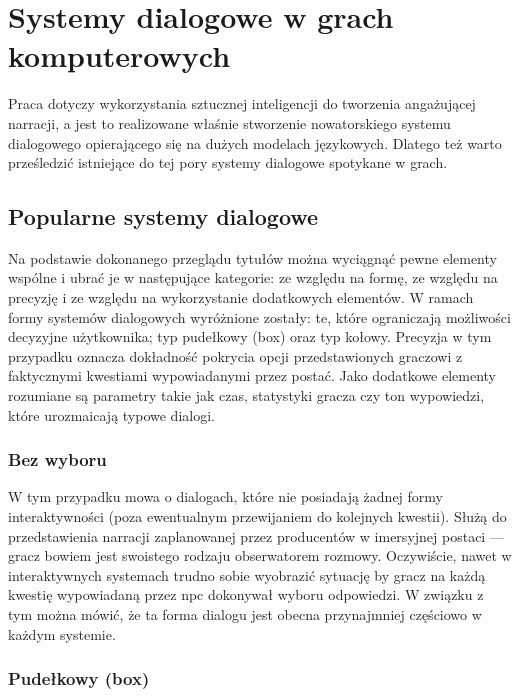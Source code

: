 \graphicspath{{chapters/chapter3/imgs/}}

\chapter{Systemy dialogowe w grach komputerowych}\label{section:ch3}

Praca dotyczy wykorzystania sztucznej inteligencji do tworzenia angażującej narracji, a jest
to realizowane właśnie stworzenie nowatorskiego systemu dialogowego opierającego się
na dużych modelach językowych. Dlatego też warto prześledzić istniejące do tej pory systemy
dialogowe spotykane w grach.

\section{Popularne systemy dialogowe}\label{subsection:ch3_1}

Na podstawie dokonanego przeglądu tytułów można wyciągnąć pewne elementy wspólne i ubrać je
w następujące kategorie: ze względu na formę, ze względu na precyzję i ze względu na wykorzystanie
dodatkowych elementów. W ramach formy systemów dialogowych wyróżnione zostały: te, które ograniczają
możliwości decyzyjne użytkownika; typ pudełkowy (box) oraz typ kołowy. Precyzja w tym przypadku
oznacza dokładność pokrycia opcji przedstawionych graczowi z faktycznymi kwestiami wypowiadanymi
przez postać. Jako dodatkowe elementy rozumiane są parametry takie jak czas, statystyki gracza
czy ton wypowiedzi, które urozmaicają typowe dialogi.

\subsection{Bez wyboru}

W tym przypadku mowa o dialogach, które nie posiadają żadnej formy interaktywności (poza
ewentualnym przewijaniem do kolejnych kwestii). Służą do przedstawienia narracji zaplanowanej
przez producentów w imersyjnej postaci --- gracz bowiem jest swoistego rodzaju obserwatorem
rozmowy. Oczywiście, nawet w interaktywnych systemach trudno sobie wyobrazić sytuację by gracz
na każdą kwestię wypowiadaną przez \gls{npc} dokonywał wyboru odpowiedzi. W związku z tym można mówić,
że ta forma dialogu jest obecna przynajmniej częściowo w każdym systemie.

\subsection{Pudełkowy (box)}

